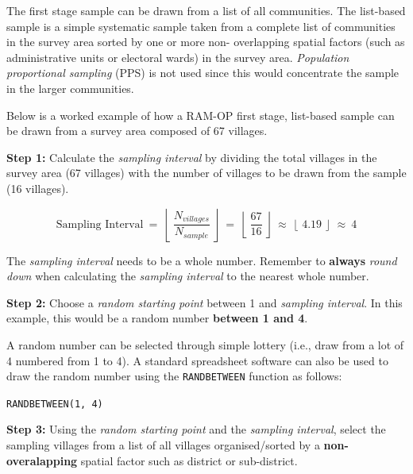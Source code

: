 \documentclass[12pt,]{book}
\theoremstyle{definition}
\theoremstyle{definition}
\theoremstyle{definition}
\theoremstyle{remark}
\begin{document}
The first stage sample can be drawn from a list of all communities. The
list-based sample is a simple systematic sample taken from a complete
list of communities in the survey area sorted by one or more non-
overlapping spatial factors (such as administrative units or electoral
wards) in the survey area. \emph{Population proportional sampling} (PPS)
is not used since this would concentrate the sample in the larger
communities.

Below is a worked example of how a RAM-OP first stage, list-based sample
can be drawn from a survey area composed of 67 villages.

\textbf{Step 1:} Calculate the \emph{sampling interval} by dividing the
total villages in the survey area (67 villages) with the number of
villages to be drawn from the sample (16 villages).

\[ \text{Sampling Interval} ~ = ~ \left \lfloor ~ \frac{N_{villages}}{N_{sample}} ~ \right \rfloor ~ = ~ \left \lfloor ~ \frac{67}{16} ~ \right \rfloor ~ \approx ~ \left \lfloor ~ 4.19 ~ \right \rfloor ~ \approx ~ 4 \]

The \emph{sampling interval} needs to be a whole number. Remember to
\textbf{always} \emph{round down} when calculating the \emph{sampling
interval} to the nearest whole number.

\textbf{Step 2:} Choose a \emph{random starting point} between 1 and
\emph{sampling interval}. In this example, this would be a random number
\textbf{between 1 and 4}.

A random number can be selected through simple lottery (i.e., draw from
a lot of 4 numbered from 1 to 4). A standard spreadsheet software can
also be used to draw the random number using the \texttt{RANDBETWEEN}
function as follows:

\texttt{RANDBETWEEN(1,\ 4)}

\textbf{Step 3:} Using the \emph{random starting point} and the
\emph{sampling interval}, select the sampling villages from a list of
all villages organised/sorted by a \textbf{non-overalapping} spatial
factor such as district or sub-district.
\end{document}
